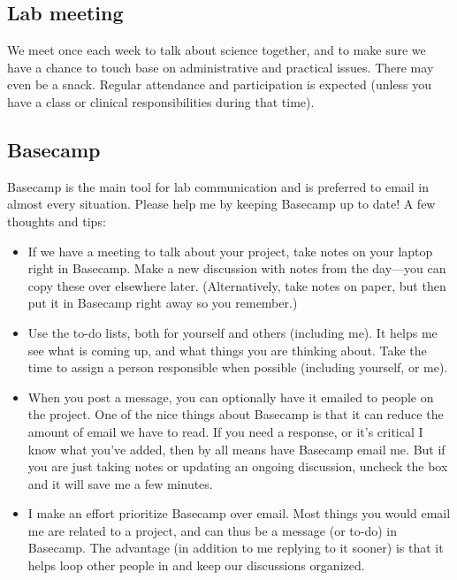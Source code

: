 \documentclass[letterpaper,12pt,oneside]{memoir}
\begin{document}
\subsection{Lab meeting}
We meet once each week to talk about science together, and to make sure we have a chance to touch base on administrative and practical issues. There may even be a snack. Regular attendance and participation is expected (unless you have a class or clinical responsibilities during that time).


\subsection{Basecamp}
Basecamp is the main tool for lab communication and is preferred to email in almost every situation. Please help me by keeping Basecamp up to date! A few thoughts and tips:

\begin{itemize}
\item If we have a meeting to talk about your project, take notes on your laptop right in Basecamp. Make a new discussion with notes from the day---you can copy these over elsewhere later. (Alternatively, take notes on paper, but then put it in Basecamp right away so you remember.)

\item Use the to-do lists, both for yourself and others (including me). It helps me see what is coming up, and what things you are thinking about. Take the time to assign a person responsible when possible (including yourself, or me).

\item When you post a message, you can optionally have it emailed to people on the project. One of the nice things about Basecamp is that it can reduce the amount of email we have to read. If you need a response, or it's critical I know what you've added, then by all means have Basecamp email me. But if you are just taking notes or updating an ongoing discussion, uncheck the box and it will save me a few minutes.

\item I make an effort prioritize Basecamp over email. Most things you would email me are related to a project, and can thus be a message (or to-do) in Basecamp. The advantage (in addition to me replying to it sooner) is that it helps loop other people in and keep our discussions organized.

\end{itemize}
\end{document}
